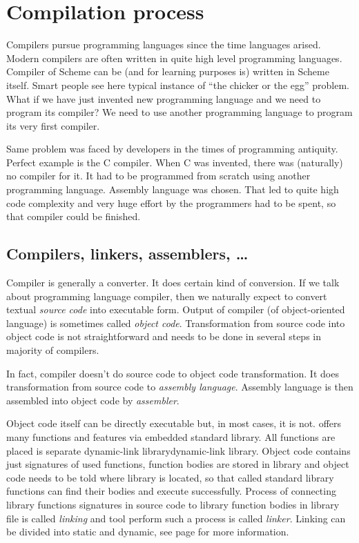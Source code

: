 \chapter{Compilation process}\label{section:compilation}
Compilers pursue programming languages since the time languages arised. Modern compilers are often written in quite high level programming languages. Compiler of Scheme can be (and for learning purposes is) written in Scheme itself. Smart people see here typical instance of \enquote{the chicker or the egg} problem. What if we have just invented new programming language and we need to program its compiler? We need to use another programming language to program its very first compiler.

Same problem was faced by developers in the times of programming antiquity. Perfect example is the C compiler. When C was invented, there was (naturally) no compiler for it. It had to be programmed from scratch using another programming language. Assembly language was chosen. That led to quite high code complexity and very huge effort by the programmers had to be spent, so that compiler could be finished.

\section{Compilers, linkers, assemblers, \ldots}
Compiler is generally a converter. It does certain kind of conversion. If we talk about programming language compiler, then we naturally expect to convert textual \textit{source code} into executable form. Output of compiler (of object-oriented language) is sometimes called \textit{object code}. Transformation from source code into object code is not straightforward and needs to be done in several steps in majority of \cpp compilers.

In fact, compiler doesn't do source code to object code transformation. It does transformation from source code to \textit{assembly language}. Assembly language is then assembled into object code by \textit{assembler}.

Object code itself can be directly executable but, in most cases, it is not. \cpp offers many functions and features via embedded standard library. All functions are placed is separate dynamic-link library{dynamic-link library}. Object code contains just signatures of used functions, function bodies are stored in library and object code needs to be told where library is located, so that called standard library functions can find their bodies and execute successfully. Process of connecting library functions signatures in source code to library function bodies in library file is called \textit{linking} and tool perform such a process is called \textit{linker}. Linking can be divided into static and dynamic, see page \pageref{listing:linking} for more information.


